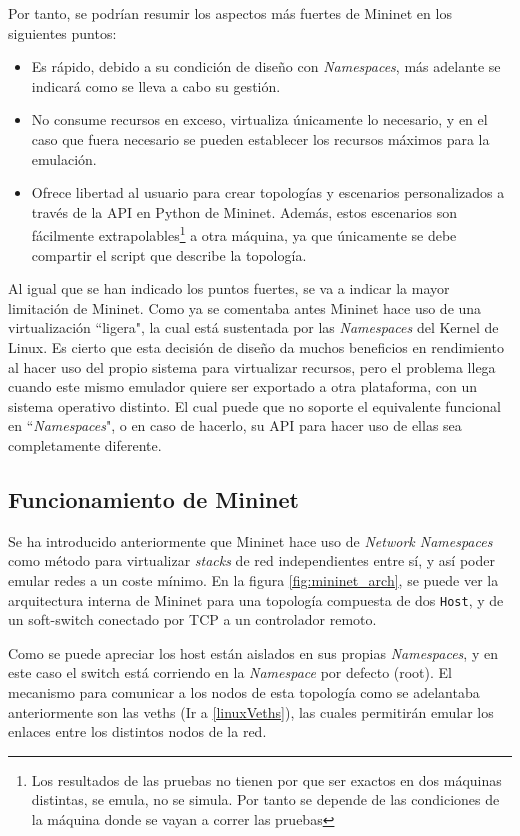 Por tanto, se podrían resumir los aspectos más fuertes de Mininet en los siguientes puntos:

\begin{itemize}
    \item Es rápido, debido a su condición de diseño con \textit{Namespaces}, más adelante se indicará como se lleva a cabo su gestión.
    \item No consume recursos en exceso, virtualiza únicamente lo necesario, y en el caso que fuera necesario se pueden establecer los recursos máximos para la emulación.
    \item Ofrece libertad al usuario para crear topologías y escenarios personalizados a través de la API en Python de Mininet. Además, estos escenarios son fácilmente extrapolables\footnote{Los resultados de las pruebas no tienen por que ser exactos en dos máquinas distintas, se emula, no se simula. Por tanto se depende de las condiciones de la máquina donde se vayan a correr las pruebas} a otra máquina, ya que únicamente se debe compartir el script que describe la topología.
\end{itemize}

Al igual que se han indicado los puntos fuertes, se va a indicar la mayor limitación de Mininet. Como ya se comentaba antes Mininet hace uso de una virtualización ``ligera", la cual está sustentada por las \textit{Namespaces} del Kernel de Linux. Es cierto que esta decisión de diseño da muchos beneficios en rendimiento al hacer uso del propio sistema para virtualizar recursos, pero el problema llega cuando este mismo emulador quiere ser exportado a otra plataforma, con un sistema operativo distinto. El cual puede que no soporte el equivalente funcional en ``\textit{Namespaces}", o en caso de hacerlo, su API para hacer uso de ellas sea completamente diferente.


\subsection{Funcionamiento de Mininet}

Se ha introducido anteriormente que Mininet hace uso de \textit{Network Namespaces} como método para virtualizar \textit{stacks} de red independientes entre sí, y así poder emular redes a un coste mínimo. En la figura \ref{fig:mininet_arch}, se puede ver la arquitectura interna de Mininet para una topología compuesta de dos \texttt{Host}, y de un soft-switch conectado por TCP a un controlador remoto.\\
\par
Como se puede apreciar los host están aislados en sus propias \textit{Namespaces}, y en este caso el switch está corriendo en la \textit{Namespace} por defecto (root). El mecanismo para comunicar a los nodos de esta topología como se adelantaba anteriormente son las \gls{veth}s (Ir a \ref{linuxVeths}), las cuales permitirán emular los enlaces entre los distintos nodos de la red.\\


